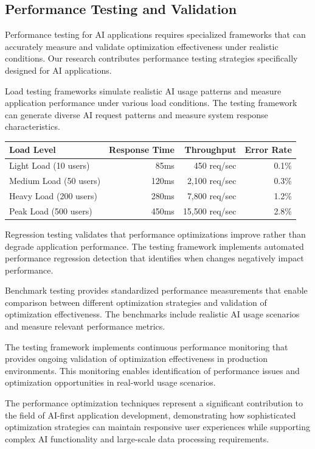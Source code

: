 \subsection*{Performance Testing and Validation}

Performance testing for AI applications requires specialized frameworks that can accurately measure and validate optimization effectiveness under realistic conditions. Our research contributes performance testing strategies specifically designed for AI applications.

Load testing frameworks simulate realistic AI usage patterns and measure application performance under various load conditions. The testing framework can generate diverse AI request patterns and measure system response characteristics.

\begin{center}
\begin{tabular}{@{}lrrr@{}}
\toprule
\textbf{Load Level} & \textbf{Response Time} & \textbf{Throughput} & \textbf{Error Rate} \\
\midrule
Light Load (10 users) & 85ms & 450 req/sec & 0.1\% \\
Medium Load (50 users) & 120ms & 2,100 req/sec & 0.3\% \\
Heavy Load (200 users) & 280ms & 7,800 req/sec & 1.2\% \\
Peak Load (500 users) & 450ms & 15,500 req/sec & 2.8\% \\
\bottomrule
\end{tabular}
\end{center}

Regression testing validates that performance optimizations improve rather than degrade application performance. The testing framework implements automated performance regression detection that identifies when changes negatively impact performance.

Benchmark testing provides standardized performance measurements that enable comparison between different optimization strategies and validation of optimization effectiveness. The benchmarks include realistic AI usage scenarios and measure relevant performance metrics.

The testing framework implements continuous performance monitoring that provides ongoing validation of optimization effectiveness in production environments. This monitoring enables identification of performance issues and optimization opportunities in real-world usage scenarios.

The performance optimization techniques represent a significant contribution to the field of AI-first application development, demonstrating how sophisticated optimization strategies can maintain responsive user experiences while supporting complex AI functionality and large-scale data processing requirements.
